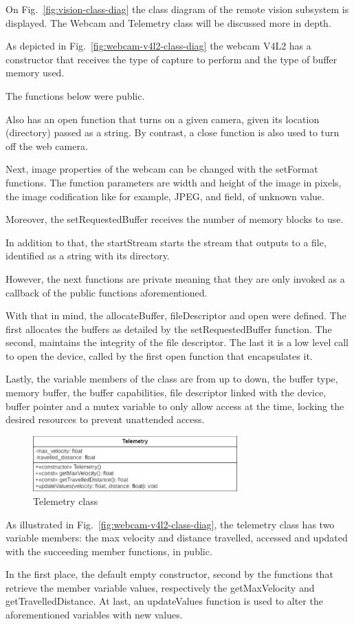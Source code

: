 On Fig.~\ref{fig:vision-class-diag} the class diagram of the remote vision subsystem is displayed. The Webcam and Telemetry class will be discussed more in depth. 

As depicted in Fig.~\ref{fig:webcam-v4l2-class-diag} the
webcam V4L2 has a constructor that receives the type of capture to perform and the type of buffer memory used.

The functions below were public.

Also has an open function that turns on a given camera, given its location (directory) passed as a string. By contrast, a close function is also used to turn off the web camera.

Next, image properties of the webcam can be changed with the setFormat functions. The function parameters are width and height of the image in pixels, the image codification like for example, JPEG, and field, of unknown value.

Moreover, the setRequestedBuffer receives the number of memory  blocks to use.

In addition to that, the startStream starts the stream that outputs to a file, identified as a string with its directory.

However, the next functions are private meaning that they are only invoked as a callback of the public functions aforementioned.

With that in mind, the allocateBuffer, fileDescriptor and open were defined. The first allocates the buffers as detailed by the setRequestedBuffer function. The second, maintains the integrity of the file descriptor. The last it is a low level call to open the device, called by the first open function that encapsulates it.

Lastly, the variable members of the class are from up to down, the buffer type, memory buffer, the buffer capabilities, file descriptor linked with the device, buffer pointer and a mutex variable to only allow access at the time, locking the desired resources to prevent unattended access.
%
\begin{figure}[!hbt]
\centering
    \includegraphics[width=0.7\textwidth]{./img/telemetry_classdiag.png}
  \caption{Telemetry class}%
\label{fig:telemetry-classdiag}
\end{figure}
%
As illustrated in Fig.~\ref{fig:webcam-v4l2-class-diag}, the telemetry class has two variable members: the max velocity and distance travelled, accessed and updated with the succeeding member functions, in public.

In the first place, the default empty constructor, second by the functions that retrieve the member variable values, respectively the getMaxVelocity and getTravelledDistance. At last, an updateValues function is used to alter the aforementioned variables with new values.
%

